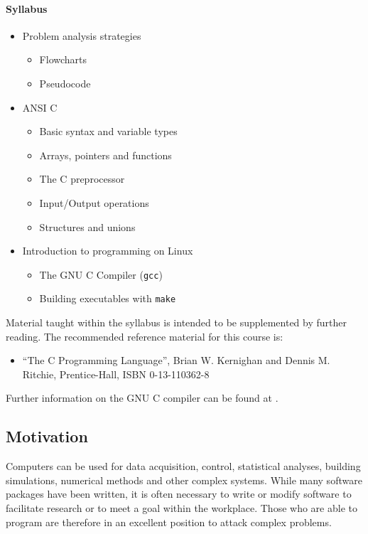 \documentclass[11pt]{scrartcl}
\def\psc{Pseudocode}
\def\linux{Linux}
\begin{document}
\paragraph{Syllabus}
\begin{itemize}
  \item Problem analysis strategies
  \begin{itemize}
    \item Flowcharts
    \item \psc 
  \end{itemize}
  \item ANSI C
  \begin{itemize}
    \item Basic syntax and variable types
    \item Arrays, pointers and functions
    \item The C preprocessor
    \item Input/Output operations
    \item Structures and unions 
  \end{itemize}
  \item Introduction to programming on \linux
  \begin{itemize}
    \item The GNU C Compiler (\texttt{gcc})
    \item Building executables with \texttt{make} 
  \end{itemize}
\end{itemize}

Material taught within the syllabus is intended to be supplemented by further reading. The recommended reference material for this course is:
\begin{itemize}
\item ``The C Programming Language'', Brian W. Kernighan and Dennis M. Ritchie, Prentice-Hall, ISBN 0-13-110362-8
\end{itemize}
Further information on the GNU C compiler can be found at \cite{gcc}.

\subsection{Motivation}
Computers can be used for data acquisition, control, statistical analyses, building simulations, numerical methods and other complex systems.  While many software packages have been written, it is often necessary to write or modify software to facilitate research or to meet a goal within the workplace.  Those who are able to program are therefore in an excellent position to attack complex problems.
\end{document}
